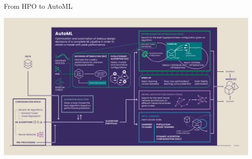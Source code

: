 \begin{frame}{From HPO to AutoML}
    \begin{center}
      \includegraphics[width = 0.9\linewidth]{images/18_AutoML-Components-Overview-Infographic_corrected.png}  
    \end{center}
\end{frame}

